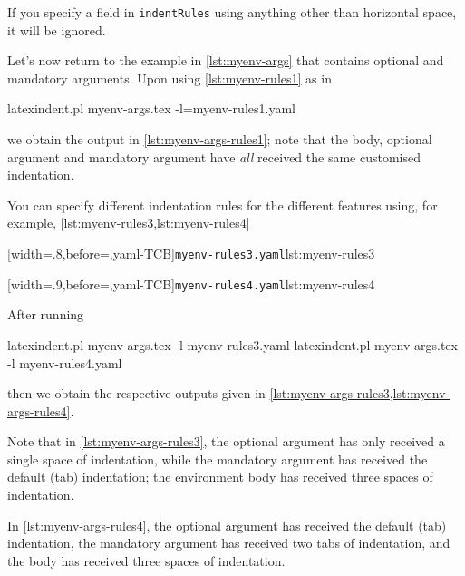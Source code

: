 
If you specify a field in \texttt{indentRules} using anything other than horizontal space, it will be ignored.

Let's now return to the example in \cref{lst:myenv-args} that contains optional and mandatory arguments. Upon using \cref{lst:myenv-rules1} as in
\begin{commandshell}
latexindent.pl myenv-args.tex -l=myenv-rules1.yaml  
\end{commandshell}
we obtain the output in \cref{lst:myenv-args-rules1}; note that the body, optional argument and mandatory argument have \emph{all} 
received the same customised indentation.

You can specify different indentation rules for the different features using, for example, \cref{lst:myenv-rules3,lst:myenv-rules4}

\begin{minipage}{.49\textwidth}
[width=.8\linewidth,before=\centering,yaml-TCB]{\texttt{myenv-rules3.yaml}}{lst:myenv-rules3}
\end{minipage}
\hfill
\begin{minipage}{.49\textwidth}
[width=.9\linewidth,before=\centering,yaml-TCB]{\texttt{myenv-rules4.yaml}}{lst:myenv-rules4}
\end{minipage}

After running
\begin{commandshell}
latexindent.pl myenv-args.tex -l myenv-rules3.yaml  
latexindent.pl myenv-args.tex -l myenv-rules4.yaml  
\end{commandshell}
then we obtain the respective outputs given in \cref{lst:myenv-args-rules3,lst:myenv-args-rules4}.

\begin{minipage}{.45\textwidth}
\end{minipage}
\hfill
\begin{minipage}{.45\textwidth}
\end{minipage}

Note that in \cref{lst:myenv-args-rules3}, the optional argument has only received a single space of indentation, while the mandatory argument 
has received the default (tab) indentation; the environment body has received three spaces of indentation.

In \cref{lst:myenv-args-rules4}, the optional argument has received the default (tab) indentation, the mandatory argument has received two tabs
of indentation, and the body has received three spaces of indentation.

